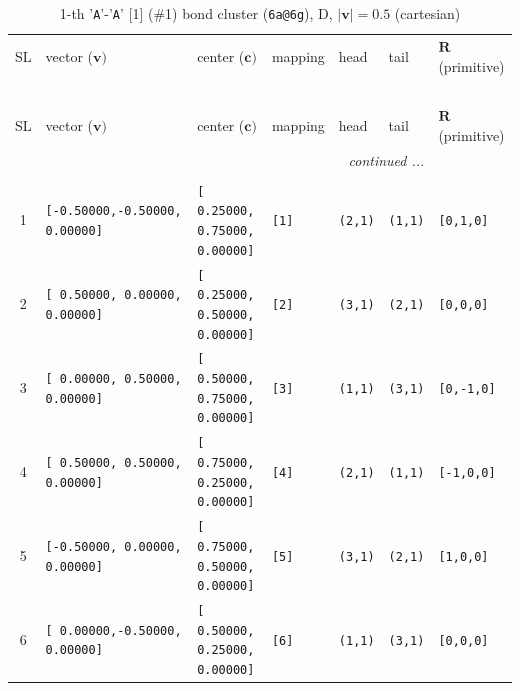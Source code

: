 \documentclass[fleqn,10pt,landscape]{jsarticle}
\begin{document}
\renewcommand{\arraystretch}{1.6}
\begin{longtable}[l]{cllllll}
\captionsetup{justification=raggedright, singlelinecheck=off}
\caption{1-th '\texttt{A}'-'\texttt{A}' [1] (\#1) bond cluster (\texttt{6a@6g}), D, $|\bm{v}|=0.5$ (cartesian)}
 \\
 \hline \hline
SL & vector ($\bm{v})$ & center ($\bm{c})$ & mapping & head & tail & $\bm{R}$ (primitive) \\ \hline \endfirsthead

\multicolumn{6}{l}{\tablename\ \thetable{}} \\
 \hline \hline
SL & vector ($\bm{v})$ & center ($\bm{c})$ & mapping & head & tail & $\bm{R}$ (primitive) \\ \hline \endhead

 \hline \hline
\multicolumn{6}{r}{\footnotesize\it continued ...} \\ \endfoot

 \hline \hline
\multicolumn{6}{r}{} \\ \endlastfoot

1 & \texttt{[-0.50000,-0.50000, 0.00000]} & \texttt{[ 0.25000, 0.75000, 0.00000]} & \texttt{[1]} & \texttt{(2,1)} & \texttt{(1,1)} & \texttt{[0,1,0]} \\ \hline
2 & \texttt{[ 0.50000, 0.00000, 0.00000]} & \texttt{[ 0.25000, 0.50000, 0.00000]} & \texttt{[2]} & \texttt{(3,1)} & \texttt{(2,1)} & \texttt{[0,0,0]} \\ \hline
3 & \texttt{[ 0.00000, 0.50000, 0.00000]} & \texttt{[ 0.50000, 0.75000, 0.00000]} & \texttt{[3]} & \texttt{(1,1)} & \texttt{(3,1)} & \texttt{[0,-1,0]} \\ \hline
4 & \texttt{[ 0.50000, 0.50000, 0.00000]} & \texttt{[ 0.75000, 0.25000, 0.00000]} & \texttt{[4]} & \texttt{(2,1)} & \texttt{(1,1)} & \texttt{[-1,0,0]} \\ \hline
5 & \texttt{[-0.50000, 0.00000, 0.00000]} & \texttt{[ 0.75000, 0.50000, 0.00000]} & \texttt{[5]} & \texttt{(3,1)} & \texttt{(2,1)} & \texttt{[1,0,0]} \\ \hline
6 & \texttt{[ 0.00000,-0.50000, 0.00000]} & \texttt{[ 0.50000, 0.25000, 0.00000]} & \texttt{[6]} & \texttt{(1,1)} & \texttt{(3,1)} & \texttt{[0,0,0]} \\
\end{longtable}
\end{document}
